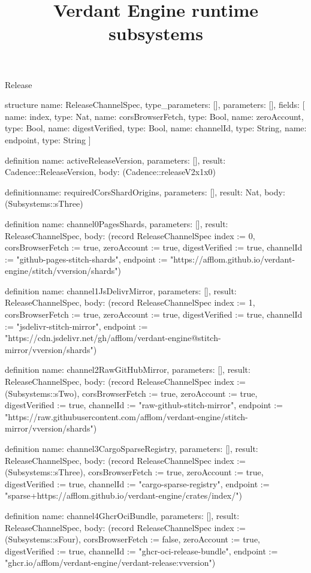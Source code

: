 \begin{lexlean}{Release}
\title{Verdant Engine runtime subsystems}
\begin{semanticmodule}
structure{
  name: ReleaseChannelSpec,
  type_parameters: [],
  parameters: [],
  fields: [
    {name: index, type: Nat},
    {name: corsBrowserFetch, type: Bool},
    {name: zeroAccount, type: Bool},
    {name: digestVerified, type: Bool},
    {name: channelId, type: String},
    {name: endpoint, type: String}
  ]
}

definition{
  name: activeReleaseVersion,
  parameters: [],
  result: Cadence::ReleaseVersion,
  body: (Cadence::releaseV2x1x0)
}

definition{name: requiredCorsShardOrigins, parameters: [], result: Nat, body: (Subsystems::sThree)}

definition{
  name: channel0PagesShards,
  parameters: [],
  result: ReleaseChannelSpec,
  body: (record ReleaseChannelSpec {index := 0, corsBrowserFetch := true, zeroAccount := true, digestVerified := true, channelId := "github-pages-stitch-shards", endpoint := "https://afflom.github.io/verdant-engine/stitch/v{version}/shards"})
}

definition{
  name: channel1JsDelivrMirror,
  parameters: [],
  result: ReleaseChannelSpec,
  body: (record ReleaseChannelSpec {index := 1, corsBrowserFetch := true, zeroAccount := true, digestVerified := true, channelId := "jsdelivr-stitch-mirror", endpoint := "https://cdn.jsdelivr.net/gh/afflom/verdant-engine@stitch-mirror/v{version}/shards"})
}

definition{
  name: channel2RawGitHubMirror,
  parameters: [],
  result: ReleaseChannelSpec,
  body: (record ReleaseChannelSpec {index := (Subsystems::sTwo), corsBrowserFetch := true, zeroAccount := true, digestVerified := true, channelId := "raw-github-stitch-mirror", endpoint := "https://raw.githubusercontent.com/afflom/verdant-engine/stitch-mirror/v{version}/shards"})
}

definition{
  name: channel3CargoSparseRegistry,
  parameters: [],
  result: ReleaseChannelSpec,
  body: (record ReleaseChannelSpec {index := (Subsystems::sThree), corsBrowserFetch := true, zeroAccount := true, digestVerified := true, channelId := "cargo-sparse-registry", endpoint := "sparse+https://afflom.github.io/verdant-engine/crates/index/"})
}

definition{
  name: channel4GhcrOciBundle,
  parameters: [],
  result: ReleaseChannelSpec,
  body: (record ReleaseChannelSpec {index := (Subsystems::sFour), corsBrowserFetch := false, zeroAccount := true, digestVerified := true, channelId := "ghcr-oci-release-bundle", endpoint := "ghcr.io/afflom/verdant-engine/verdant-release:v{version}"})
}


\end{semanticmodule}
\end{lexlean}
